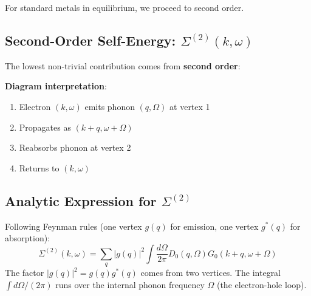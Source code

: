 \documentclass[12pt]{article}
\begin{document}
For standard metals in equilibrium, we proceed to second order.

\subsection{Second-Order Self-Energy: $\Sigma^{(2)}(k,\omega)$}

The lowest non-trivial contribution comes from \textbf{second order}:

\begin{center}
\end{center}

\textbf{Diagram interpretation}:
\begin{enumerate}
\item Electron $(k,\omega)$ emits phonon $(q,\Omega)$ at vertex 1
\item Propagates as $(k+q,\omega+\Omega)$
\item Reabsorbs phonon at vertex 2
\item Returns to $(k,\omega)$
\end{enumerate}

\subsection{Analytic Expression for $\Sigma^{(2)}$}

Following Feynman rules (one vertex $g(q)$ for emission, one vertex $g^*(q)$ for absorption):
\begin{equation}
\boxed{
\Sigma^{(2)}(k,\omega) = \sum_q |g(q)|^2 \int \frac{d\Omega}{2\pi} D_0(q,\Omega) G_0(k+q,\omega+\Omega)
}
\end{equation}
The factor $|g(q)|^2 = g(q)g^*(q)$ comes from two vertices. The integral $\int d\Omega/(2\pi)$ runs over the internal phonon frequency $\Omega$ (the electron-hole loop).
\end{document}
